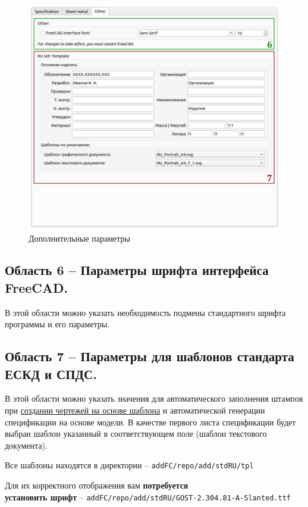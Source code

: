\documentclass[a4paper,12pt]{article}
\begin{document}
\begin{figure}[htp]
	\centering
	\includegraphics[width=1\textwidth]{img/pref_other.png}
	\caption{Дополнительные параметры}
	\label{sec:pref_other}
\end{figure}

\subsection{Область 6 -- Параметры шрифта интерфейса FreeCAD.}
В этой области можно указать необходимость подмены стандартного шрифта программы и его параметры.

\subsection{Область 7 -- Параметры для шаблонов стандарта ЕСКД и СПДС.}
В этой области можно указать значения для автоматического заполнения штампов при \hyperref[sec:8]{создании чертежей на основе шаблона} и автоматической генерации спецификации на основе модели. В качестве первого листа спецификации будет выбран шаблон указанный в соответствующем поле (шаблон текстового документа).

Все шаблоны находятся в директории -- \verb|addFC/repo/add/stdRU/tpl|

Для их корректного отображения вам \textbf{потребуется\\установить шрифт} -- \verb|addFC/repo/add/stdRU/GOST-2.304.81-A-Slanted.ttf|\\
\end{document}
